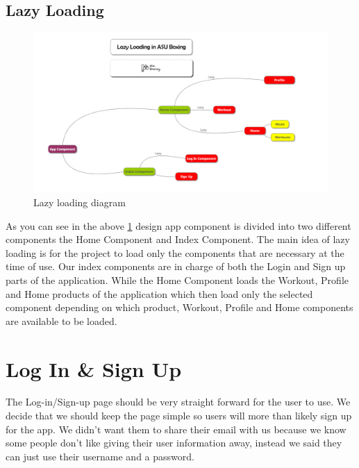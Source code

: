 \documentclass[a4paper,12pt]{report}
\begin{document}
\subsection{Lazy Loading}
\begin{figure}[h]
\includegraphics[scale=.5]{images/Lazy-Loading(4).PNG}
\caption{Lazy loading diagram}
\label{fig:LazyLoading}
\end{figure}
\newpage
As you can see in the above \ref{fig:LazyLoading} design app component is divided into two different components the Home Component and Index Component.
The main idea of lazy loading is for the project to load only the components that are necessary at the time of use. 
Our index components are in charge of both the Login and Sign up parts of the application.
While the Home Component loads the Workout, Profile and Home products of the application which then load only the selected component depending on which product, Workout, Profile and Home components are available to be loaded. 

\section{Log In \& Sign Up}
The Log-in/Sign-up page should be very straight forward for the user to use. We decide that we should keep the page simple so users will more than likely sign up for the app. We didn't want them to share their email with us because we know some people don't like giving their user information away, instead we said they can just use their username and a password.
\end{document}
